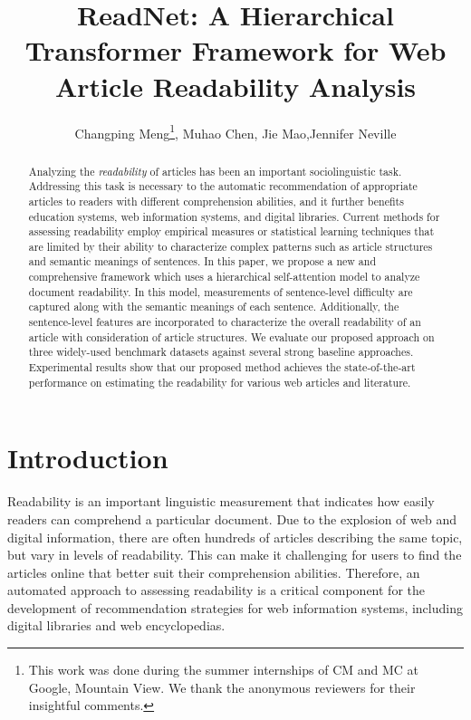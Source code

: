 \documentclass[runningheads]{llncs}
\begin{document}
\title{ReadNet: A Hierarchical Transformer Framework for Web Article Readability Analysis}
\author{
Changping Meng\thanks{This work was done during the summer internships of CM and MC at Google, Mountain View. We thank the anonymous reviewers for their insightful comments.}, Muhao Chen, Jie Mao,Jennifer Neville 
}




\maketitle
\begin{abstract}
Analyzing the {\em readability} of articles has been
an important sociolinguistic task.
Addressing this task is necessary to the automatic recommendation of appropriate articles to readers with different comprehension abilities, and it further benefits education systems, web information systems, and digital libraries.
Current methods for assessing readability employ empirical measures or statistical learning techniques that are limited by their ability to characterize complex patterns such as article structures and semantic meanings of sentences.
In this paper, we propose a new and comprehensive framework which uses a hierarchical self-attention model to analyze document readability.
In this model, measurements of sentence-level difficulty are captured along with the semantic meanings of each sentence.
Additionally, the sentence-level features are incorporated to characterize the overall readability of an article with consideration of article structures.
We evaluate our proposed approach on three widely-used benchmark datasets against several strong baseline approaches. Experimental results show that our proposed method achieves the state-of-the-art performance on estimating the readability for various web articles and literature.
\end{abstract}
 \section{Introduction}\label{intro}
Readability is an important linguistic measurement that indicates how easily readers can comprehend a particular document.
Due to the explosion of web and digital information, there are often hundreds of articles describing the same topic, but vary in levels of readability.
This can make it challenging for users to find the articles online that better suit their comprehension abilities.
Therefore, an automated approach to assessing readability is a critical component for the development of 
recommendation strategies for web information systems, including digital libraries and web encyclopedias.
\end{document}
